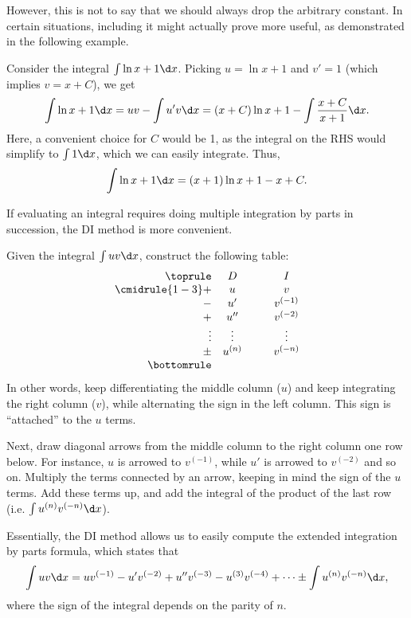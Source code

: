 However, this is not to say that we should always drop the arbitrary constant. In certain situations, including it might actually prove more useful, as demonstrated in the following example.

\begin{example}
    Consider the integral $\int \ln{x + 1} \d x$. Picking $u = \ln{x+1}$ and $v' = 1$ (which implies $v = x + C$), we get \[\int \ln{x+1} \d x = uv - \int u' v \d x = (x + C) \ln{x+1} - \int \frac{x+C}{x+1} \d x.\] Here, a convenient choice for $C$ would be 1, as the integral on the RHS would simplify to $\int 1 \d x$, which we can easily integrate. Thus, \[\int \ln{x+1} \d x = (x+1) \ln{x+1} - x + C.\]
\end{example}

If evaluating an integral requires doing multiple integration by parts in succession, the DI method is more convenient.

\begin{recipe}[DI Method]
    Given the integral $\int uv \d x $, construct the following table:
    \[
    \begin{array}{r c @{\hspace*{1.0cm}} c}\toprule
        & D & I \\\cmidrule{1-3}
        + & u & v \\
        - & u' & v^{(-1)} \\
        + & u'' & v^{(-2)} \\
        \vdots & \vdots & \vdots \\
        \pm & u^{(n)} & v^{(-n)}\\\bottomrule
    \end{array}
    \]
    In other words, keep differentiating the middle column ($u$) and keep integrating the right column ($v$), while alternating the sign in the left column. This sign is ``attached'' to the $u$ terms.

    Next, draw diagonal arrows from the middle column to the right column one row below. For instance, $u$ is arrowed to $v^{(-1)}$, while $u'$ is arrowed to $v^{(-2)}$ and so on. Multiply the terms connected by an arrow, keeping in mind the sign of the $u$ terms. Add these terms up, and add the integral of the product of the last row (i.e. $\int u^{(n)} v^{(-n)} \d x$).
\end{recipe}

Essentially, the DI method allows us to easily compute the extended integration by parts formula, which states that \[\int uv \d x = u v^{(-1)} - u' v^{(-2)} + u'' v^{(-3)} - u^{(3)} v^{(-4)} + \dots \pm \int u^{(n)} v^{(-n)} \d x,\] where the sign of the integral depends on the parity of $n$.

